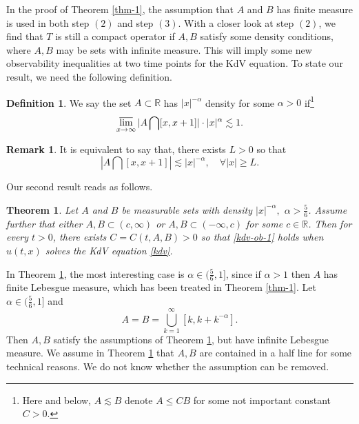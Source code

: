 \documentclass[12pt]{amsart}
\def\R {\mathbb{R}}
\newtheorem{theorem}[proposition]{Theorem}
\theoremstyle{definition}
\newtheorem{definition}[proposition]{Definition}
\newtheorem{remark}[proposition]{Remark}
\numberwithin{equation}{section}
\begin{document}
In the proof of Theorem \ref{thm-1}, the assumption that $A$ and $B$ has finite measure is used in both step $(2)$ and step $(3)$. With a closer look at step $(2)$, we find that $T$ is still a compact operator if $A,B$ satisfy some density conditions, where $A,B$ may be sets with infinite measure. This will imply some new observability inequalities at two time points for the KdV equation. To state our result, we need the following definition.

%
%

\begin{definition}
    We say the set $A\subset \R$ has $|x|^{-\alpha}$ density for some $\alpha>0$  if\footnote{Here and below, $A\lesssim B$ denote $A\leq CB$ for some not important constant $C>0$.}
    $$
    \varlimsup_{x\to \infty}|A\bigcap[x,x+1]|\cdot|x|^{\alpha}\lesssim 1.
    $$
\end{definition}
\begin{remark}\label{rem-1}
    It is equivalent to say that, there exists $L>0$ so that
    $$
        |A\bigcap[x,x+1]|\lesssim |x|^{-\alpha}, \quad \forall |x|\geq L.
    $$
\end{remark}


Our second result reads as follows.

\begin{theorem}\label{thm-2}
    Let  $A$ and $B$ be measurable sets with density $|x|^{-\alpha},$ $\alpha>\frac{5}{6}$. Assume further that either $A,B\subset (c,\infty)$ or $A,B\subset (-\infty,c)$  for some $c\in\R$. Then for every $t>0$, there exists $C=C(t,A,B)>0$ so that \eqref{kdv-ob-1} holds when $u(t,x)$  solves the KdV equation \eqref{kdv}.
\end{theorem}

In Theorem \ref{thm-2}, the most interesting case is $\alpha\in(\frac{5}{6},1]$, since if $\alpha>1$ then $A$ has finite Lebesgue measure, which has been treated in Theorem \ref{thm-1}. Let $\alpha\in (\frac{5}{6},1]$ and
$$
A=B=\bigcup_{k=1}^\infty [k,k+k^{-\alpha}].
$$
Then $A,B$ satisfy the assumptions of Theorem \ref{thm-2}, but have infinite Lebesgue measure. We assume in Theorem \ref{thm-2} that $A,B$ are contained in a half line for some technical reasons. We do not know whether the assumption can be removed.
\end{document}
